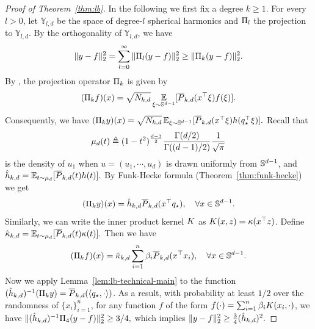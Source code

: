 \begin{proof}[Proof of Theorem~\ref{thm:lb}]
	In the following we first fix a degree $k\ge 1$.
	For every $l>0$, let $\mathbb{Y}_{l,d}$ be the space of degree-$l$ spherical harmonics and $\Pi_l$ the projection to $\mathbb{Y}_{l,d}$. By the orthogonality of $\mathbb{Y}_{l,d}$, we have
	\begin{align}
		\|y-f\|_2^2=\sum_{l=0}^{\infty}\|\Pi_l(y-f)\|_2^2\ge \|\Pi_k(y-f)\|_2^2.
	\end{align}
	By \citet[Section 2.3]{atkinson2012spherical}, the projection operator $\Pi_k$ is given by 
	\begin{align}
		(\Pi_k f)(x)=\sqrt{N_{k,d}}\operatorname*{\mathbb{E}}_{\xi\sim \mathbb{S}^{d-1}}[\overline{P}_{k,d}(x^\top \xi)f(\xi)].
	\end{align}
	Consequently, we have $(\Pi_k y)(x)=\sqrt{N_{k,d}}\operatorname*{\mathbb{E}}_{\xi\sim \mathbb{S}^{d-1}}[\overline{P}_{k,d}(x^\top \xi)h(q_\star^\top \xi)].$ Recall that
\begin{align}
\mu_d(t)\triangleq (1-t^2)^{\frac{d-3}{2}}\frac{\Gamma(d/2)}{\Gamma((d-1)/2)}\frac{1}{\sqrt{\pi}}
\end{align}
is the density of $u_1$ when $u=(u_1,\cdots,u_d)$ is drawn uniformly from $\mathbb{S}^{d-1}$, and $\hat{h}_{k, d}=\operatorname*{\mathbb{E}}_{t\sim \mu_d}[\overline{P}_{k,d}(t)h(t)].$ By Funk-Hecke formula (Theorem~\ref{thm:funk-hecke}) we get 
	\begin{align}
		(\Pi_k y)(x)=\hat{h}_{k, d} \overline{P}_{k,d}(x^\top q_\star),\quad\forall x\in\mathbb{S}^{d-1}.
	\end{align}
	Similarly, we can write the inner product kernel $K$ as $K(x,z)=\kappa(x^\top z)$. Define $\hat{\kappa}_{k, d}=\operatorname*{\mathbb{E}}_{t\sim \mu_d}[\overline{P}_{k,d}(t)\kappa(t)].$ Then we have 
	\begin{align}
		(\Pi_k f)(x)=\hat{\kappa}_{k, d} \sum_{i=1}^{n}\beta_i\overline{P}_{k,d}(x^\top x_i),\quad\forall x\in\mathbb{S}^{d-1}.
	\end{align}
	Now we apply Lemma~\ref{lem:lb-technical-main} to the function $(\hat{h}_{k, d})^{-1}(\Pi_k y)=\overline{P}_{k,d}(\left<q_\star, \cdot\right>)$. As a result, with probability at least $1/2$ over the randomness of $\{x_i\}_{i=1}^{n}$, for any function $f$ of the form $f(\cdot)=\sum_{i=1}^{n}\beta_i K(x_i,\cdot)$, we have $\|(\hat{h}_{k, d})^{-1}\Pi_4(y-f)\|_2^2\ge 3/4,$ which implies $\|y-f\|_2^2\ge \frac{3}{4}(\hat{h}_{k, d})^2.$
\end{proof}

